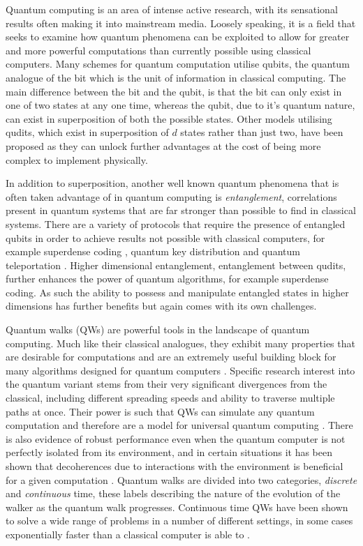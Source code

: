Quantum computing is an area of intense active research, with its sensational results often making it into mainstream media.
Loosely speaking, it is a field that seeks to examine how quantum phenomena can be exploited to allow for greater and more powerful computations than currently possible using classical computers.
Many schemes for quantum computation utilise qubits, the quantum analogue of the bit which is the unit of information in classical computing.
The main difference between the bit and the qubit, is that the bit can only exist in one of two states at any one time, whereas the qubit, due to it's quantum nature, can exist in superposition of both the possible states.
Other models utilising qudits, which exist in superposition of $d$ states rather than just two, have been proposed as they can unlock further advantages at the cost of being more complex to implement physically.

In addition to superposition, another well known quantum phenomena that is often taken advantage of in quantum computing is \emph{entanglement}, correlations present in quantum systems that are far stronger than possible to find in classical systems.
There are a variety of protocols that require the presence of entangled qubits in order to achieve results not possible with classical computers, for example superdense coding \cite{Superdense}, quantum key distribution \cite{qkd} and quantum teleportation \cite{qteleport}.
Higher dimensional entanglement, entanglement between qudits, further enhances the power of quantum algorithms, for example superdense coding.
As such the ability to possess and manipulate entangled states in higher dimensions has further benefits but again comes with its own challenges. \newline

Quantum walks (QWs) are powerful tools in the landscape of quantum computing. 
Much like their classical analogues, they exhibit many properties that are desirable for computations and are an extremely useful building block for many algorithms designed for quantum computers \cite{shenvi2003}. 
Specific research interest into the quantum variant stems from their very significant divergences from the classical, including different spreading speeds and ability to traverse multiple paths at once. 
Their power is such that QWs can simulate any quantum computation and therefore are a model for universal quantum computing \cite{Childs_2009}.
There is also evidence of robust performance even when the quantum computer is not perfectly isolated from its environment, and in certain situations it has been shown that decoherences due to interactions with the environment is beneficial for a given computation \cite{KENDON_2007}. 
Quantum walks are divided into two categories, \emph{discrete} and \emph{continuous} time, these labels describing the nature of the evolution of the walker as the quantum walk progresses.
Continuous time QWs have been shown to solve a wide range of problems in a number of different settings, in some cases exponentially faster than a classical computer is able to \cite{Childs_2003}. 

